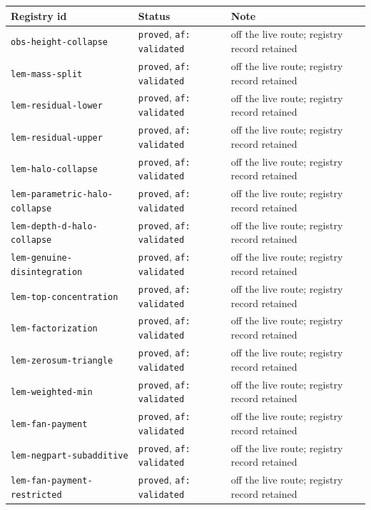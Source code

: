 \begin{longtable}{@{}p{}p{}p{}@{}}
\toprule
Registry id & Status & Note \\
\midrule
\endhead
\texttt{obs-height-collapse} & \texttt{proved}, \texttt{af: validated} & off the live route; registry record retained \\
\texttt{lem-mass-split} & \texttt{proved}, \texttt{af: validated} & off the live route; registry record retained \\
\texttt{lem-residual-lower} & \texttt{proved}, \texttt{af: validated} & off the live route; registry record retained \\
\texttt{lem-residual-upper} & \texttt{proved}, \texttt{af: validated} & off the live route; registry record retained \\
\texttt{lem-halo-collapse} & \texttt{proved}, \texttt{af: validated} & off the live route; registry record retained \\
\texttt{lem-parametric-halo-collapse} & \texttt{proved}, \texttt{af: validated} & off the live route; registry record retained \\
\texttt{lem-depth-d-halo-collapse} & \texttt{proved}, \texttt{af: validated} & off the live route; registry record retained \\
\texttt{lem-genuine-disintegration} & \texttt{proved}, \texttt{af: validated} & off the live route; registry record retained \\
\texttt{lem-top-concentration} & \texttt{proved}, \texttt{af: validated} & off the live route; registry record retained \\
\texttt{lem-factorization} & \texttt{proved}, \texttt{af: validated} & off the live route; registry record retained \\
\texttt{lem-zerosum-triangle} & \texttt{proved}, \texttt{af: validated} & off the live route; registry record retained \\
\texttt{lem-weighted-min} & \texttt{proved}, \texttt{af: validated} & off the live route; registry record retained \\
\texttt{lem-fan-payment} & \texttt{proved}, \texttt{af: validated} & off the live route; registry record retained \\
\texttt{lem-negpart-subadditive} & \texttt{proved}, \texttt{af: validated} & off the live route; registry record retained \\
\texttt{lem-fan-payment-restricted} & \texttt{proved}, \texttt{af: validated} & off the live route; registry record retained \\

\end{longtable}
